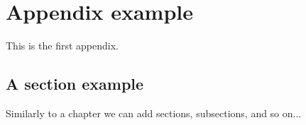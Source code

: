 \chapter{Appendix example}
\label{a1}

This is the first appendix.

\section{A section example}

Similarly to a chapter we can add sections, subsections, and so on...
